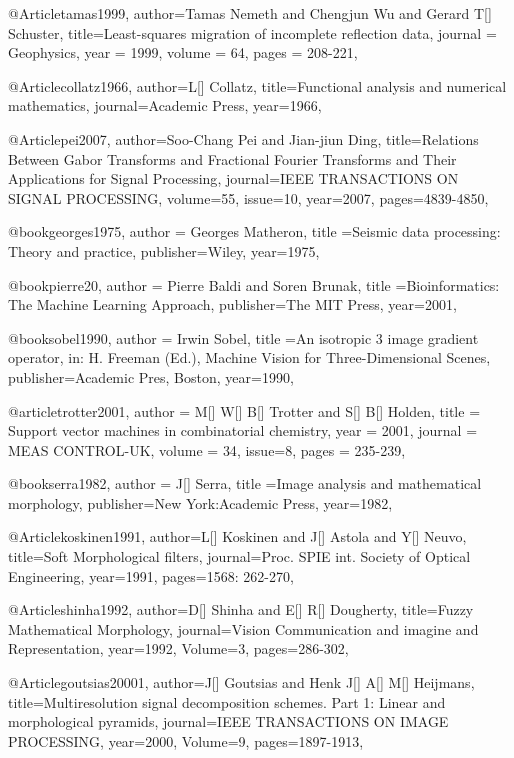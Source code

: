 @Article{tamas1999,
  author={Tamas Nemeth and Chengjun Wu and Gerard T[] Schuster},
  title={Least-squares migration of incomplete reflection data},
  journal = 	 {Geophysics},
  year = 	 1999,
  volume =	 64,
  pages =	 {208-221},
}

@Article{collatz1966,
author={L[] Collatz},
title={Functional analysis and numerical mathematics},
journal={Academic Press},
year=1966,
}

@Article{pei2007,
author={Soo-Chang Pei and Jian-jiun Ding},
title={Relations Between Gabor Transforms and Fractional {F}ourier Transforms and Their Applications for Signal Processing},
journal={IEEE TRANSACTIONS ON SIGNAL PROCESSING},
volume=55,
issue=10,
year=2007,
pages={4839-4850},
}

@book{georges1975,
  author = {Georges Matheron},
  title ={Seismic data processing: Theory and practice},
  publisher={Wiley},
  year=1975,
}

@book{pierre20,
  author = {Pierre Baldi and Soren Brunak},
  title ={Bioinformatics: The Machine Learning Approach},
  publisher={The MIT Press},
  year=2001,
}


@book{sobel1990,
  author = {Irwin Sobel},
  title ={An isotropic 3 image gradient operator, in: H. Freeman (Ed.), Machine Vision for Three-Dimensional Scenes},
  publisher={Academic Pres, Boston},
  year=1990,
}


@article{trotter2001,
author = {M[] W[] B[] Trotter and S[] B[] Holden},
title = {Support vector machines in combinatorial chemistry},
year = {2001},
journal = {MEAS CONTROL-UK},
volume = {34},
issue=8,
pages = {235-239},
}

@book{serra1982,
  author = {J[] Serra},
  title ={Image analysis and mathematical morphology},
  publisher={New York:Academic Press},
  year=1982,
}

@Article{koskinen1991,
  author={L[] Koskinen and J[] Astola and Y[] Neuvo},
  title={Soft Morphological filters},
  journal={Proc. SPIE int. Society of Optical Engineering},
  year=1991,
  pages={1568: 262-270},
}

@Article{shinha1992,
  author={D[] Shinha and E[] R[] Dougherty},
  title={Fuzzy Mathematical Morphology},
  journal={Vision Communication and imagine and Representation},
  year=1992,
  Volume=3,
  pages={286-302},
}

@Article{goutsias20001,
  author={J[] Goutsias and Henk J[] A[] M[] Heijmans},
  title={Multiresolution signal decomposition schemes. Part 1: Linear and morphological pyramids},
  journal={IEEE TRANSACTIONS ON IMAGE PROCESSING},
  year=2000,
  Volume=9,
  pages={1897-1913},
}

